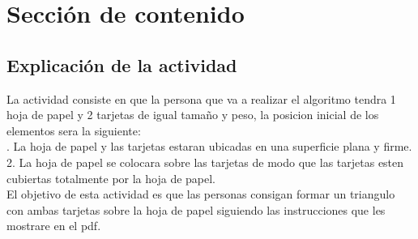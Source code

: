 \documentclass{article}
\begin{document}
\section{Sección de contenido} \label{contenido}

\subsection{Explicación de la actividad}
La actividad consiste en que la persona que va a realizar el algoritmo tendra 1 hoja de papel y 2 tarjetas de igual tamaño y peso, la posicion inicial de los elementos sera la siguiente:\\
. La hoja de papel y las tarjetas estaran ubicadas en una superficie plana y firme.\\
2. La hoja de papel se colocara sobre las tarjetas de modo que las tarjetas esten cubiertas totalmente por la hoja de papel.\\
\newline
El objetivo de esta actividad es que las personas consigan formar un triangulo con ambas tarjetas sobre la hoja de papel siguiendo las instrucciones que les mostrare en el pdf.
\end{document}
